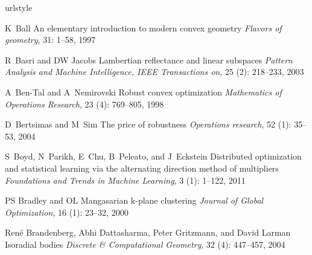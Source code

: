 \documentclass[12pt,heading]{ctexbook}
\begin{document}


\frontmatter
\tableofcontents

\mainmatter














\backmatter
\begin{thebibliography}{99}
    \providecommand{\natexlab}[1]{#1}
    \providecommand{\url}[1]{\texttt{#1}}
    \expandafter\ifx\csname urlstyle\endcsname\relax
    \providecommand{\doi}[1]{doi: #1}\else
    \providecommand{\doi}{doi: \begingroup \urlstyle{rm}\Url}\fi

    K~Ball
    \newblock An elementary introduction to modern convex geometry
    \newblock \emph{Flavors of geometry}, 31: 1--58, 1997

    R~Basri and DW Jacobs
    \newblock Lambertian reflectance and linear subspaces
    \newblock \emph{Pattern Analysis and Machine Intelligence, IEEE Transactions
    on}, 25 (2): 218--233, 2003

    A~Ben-Tal and A~Nemirovski
    \newblock Robust convex optimization
    \newblock \emph{Mathematics of Operations Research}, 23 (4):
    769--805, 1998

    D~Bertsimas and M~Sim
    \newblock The price of robustness
    \newblock \emph{Operations research}, 52 (1): 35--53, 2004

    S~Boyd, N~Parikh, E~Chu, B~Peleato, and J~Eckstein
    \newblock Distributed optimization and statistical learning via the alternating
    direction method of multipliers
    \newblock \emph{Foundations and Trends{\textregistered} in Machine Learning},
    3 (1): 1--122, 2011

    PS Bradley and OL Mangasarian
    \newblock k-plane clustering
    \newblock \emph{Journal of Global Optimization}, 16 (1):
    23--32, 2000

    Ren{\'e} Brandenberg, Abhi Dattasharma, Peter Gritzmann, and David Larman
    \newblock Isoradial bodies
    \newblock \emph{Discrete \& Computational Geometry}, 32 (4):
    447--457, 2004


\end{thebibliography}
\end{document}
